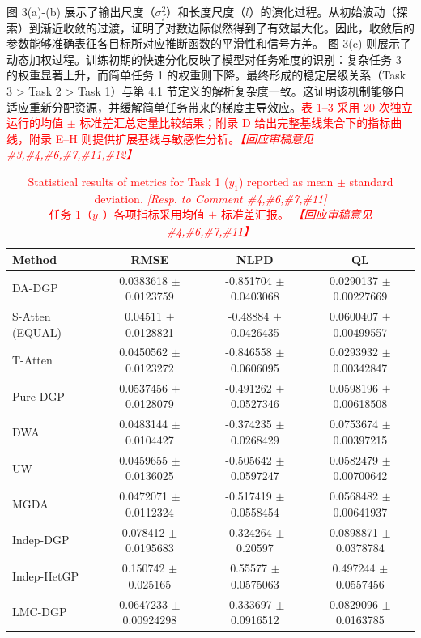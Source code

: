 \documentclass[11pt]{article}
\newcommand{\bicaption}[2]{\caption[#1]{#1\protect\\#2}}
\begin{document}
图 3(a)-(b) 展示了输出尺度（$\sigma_f^2$）和长度尺度（$l$）的演化过程。从初始波动（探索）到渐近收敛的过渡，证明了对数边际似然得到了有效最大化。因此，收敛后的参数能够准确表征各目标所对应推断函数的平滑性和信号方差。
图 3(c) 则展示了动态加权过程。训练初期的快速分化反映了模型对任务难度的识别：复杂任务 3 的权重显著上升，而简单任务 1 的权重则下降。最终形成的稳定层级关系（Task 3 > Task 2 > Task 1）与第 4.1 节定义的解析复杂度一致。这证明该机制能够自适应重新分配资源，并缓解简单任务带来的梯度主导效应。\textcolor{red}{表 1--3 采用 20 次独立运行的均值 $\pm$ 标准差汇总定量比较结果；附录 D 给出完整基线集合下的指标曲线，附录 E--H 则提供扩展基线与敏感性分析。\textit{【回应审稿意见 \#3,\#4,\#6,\#7,\#11,\#12】}}


\begin{table}[htbp]
	\centering
	\bicaption{\textcolor{red}{Statistical results of metrics for Task 1 ($y_1$) reported as mean $\pm$ standard deviation. \textit{[Resp. to Comment \#4,\#6,\#7,\#11]}}}{\textcolor{red}{任务 1（$y_1$）各项指标采用均值 $\pm$ 标准差汇报。 \textit{【回应审稿意见 \#4,\#6,\#7,\#11】}}}
	\label{tab:results_task1}
	{\color{red}\small
	\begin{tabular*}{\textwidth}{@{\extracolsep{\fill}}lccc}
		\toprule
		\textbf{Method} & \textbf{RMSE} & \textbf{NLPD} & \textbf{QL} \\
		\midrule
		DA-DGP & 0.0383618 $\pm$ 0.0123759 & -0.851704 $\pm$ 0.0403068 & 0.0290137 $\pm$ 0.00227669 \\
		S-Atten (EQUAL) & 0.04511 $\pm$ 0.0128821 & -0.48884 $\pm$ 0.0426435 & 0.0600407 $\pm$ 0.00499557 \\
		T-Atten & 0.0450562 $\pm$ 0.0123272 & -0.846558 $\pm$ 0.0606095 & 0.0293932 $\pm$ 0.00342847 \\
		Pure DGP & 0.0537456 $\pm$ 0.0128079 & -0.491262 $\pm$ 0.0527346 & 0.0598196 $\pm$ 0.00618508 \\
		DWA & 0.0483144 $\pm$ 0.0104427 & -0.374235 $\pm$ 0.0268429 & 0.0753674 $\pm$ 0.00397215 \\
		UW & 0.0459655 $\pm$ 0.0136025 & -0.505642 $\pm$ 0.0597247 & 0.0582479 $\pm$ 0.00700642 \\
		MGDA & 0.0472071 $\pm$ 0.0112324 & -0.517419 $\pm$ 0.0558454 & 0.0568482 $\pm$ 0.00641937 \\
		Indep-DGP & 0.078412 $\pm$ 0.0195683 & -0.324264 $\pm$ 0.20597 & 0.0898871 $\pm$ 0.0378784 \\
		Indep-HetGP & 0.150742 $\pm$ 0.025165 & 0.55577 $\pm$ 0.0575063 & 0.497244 $\pm$ 0.0557456 \\
		LMC-DGP & 0.0647233 $\pm$ 0.00924298 & -0.333697 $\pm$ 0.0916512 & 0.0829096 $\pm$ 0.0163785 \\
		\bottomrule
	\end{tabular*}
	}
\end{table}
\end{document}
